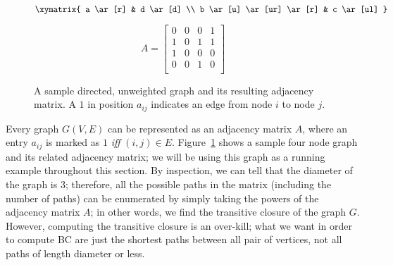 \begin{figure}
\begin{minipage}{0.20\textwidth}
\begin{center}
\begin{displaymath}
\xymatrix{
a \ar[r] & d \ar[d] \\
b \ar[u] \ar[ur] \ar[r] & c \ar[ul]
}
\end{displaymath}
\end{center}
\end{minipage}
\hspace{10pt}
\begin{minipage}{0.18\textwidth}
\begin{center}
\begin{displaymath}
A = \left[ \begin{array}{cccc}
  0 & 0 & 0 & 1 \\
  1 & 0 & 1 & 1 \\
  1 & 0 & 0 & 0 \\
  0 & 0 & 1 & 0 \\
\end{array} \right]
\end{displaymath}
\end{center}
\end{minipage}
\caption{A sample directed, unweighted graph and its resulting adjacency
matrix. A $1$ in position $a_{ij}$ indicates an edge from node $i$ to node
$j$.}
\label{fig:sample}
\end{figure}

Every graph $G(V,E)$ can be represented as an adjacency matrix $A$, where an 
entry $a_{ij}$ is marked as $1$ \textit{iff} $(i,j)\in{}E$.
%
Figure~\ref{fig:sample} shows a sample four node graph and its related 
adjacency matrix; we will be using this graph as a running example throughout
this section.
%
By inspection, we can tell that the diameter of the graph is $3$; therefore, 
all the possible paths in the matrix (including the number of paths) can be 
enumerated by simply taking the powers of the adjacency matrix $A$; in other 
words, we find the transitive closure of the graph $G$.
%
However, computing the transitive closure is an over-kill; what we want in 
order to compute BC are just the shortest paths between all pair of vertices,
not all paths of length diameter or less.

